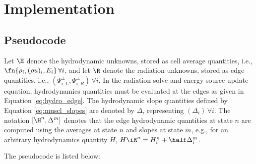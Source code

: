 \section{Implementation}
\subsection{Pseudocode}
Let $\H$ denote the hydrodynamic unknowns, stored as cell average quantities,
i.e., $\fn{\rho_i,(\rho u)_i,E_i}\,\forall i$,
and let $\R$ denote the radiation unknowns, stored as edge quantities,
i.e., $(\Psi_{i,L}^\pm,\Psi_{i,R}^\pm)\,\forall i$.
In the radiation solve and energy
source update equation, hydrodynamics quantities must be evaluated at the
edges as given in Equation \eqref{eq:hydro_edge}.
The hydrodynamic slope quantities defined by Equation \eqref{eq:muscl_slopes} are denoted
by $\Delta$, representing $(\Delta_i)\,\forall i$.
The notation $[\H^n,\Delta^m]$ denotes that the edge hydrodynamic quantities
at state $n$ are computed using the averages at state $n$ and slopes at
state $m$, e.g., for an arbitrary hydrodynamics quantity $H$,
$H\iR^n = H_i^n + \half\Delta_i^m$.

The pseudocode is listed below:

